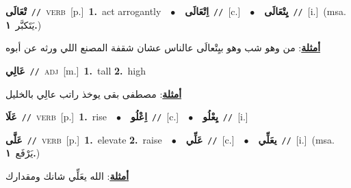 \documentclass[10pt,a4paper,twoside]{article} %
\begin{document}
\begin{multicols}{2}
{\setlength\topsep{0pt}\textbf{\foreignlanguage{arabic}{تْعَالَى}}\ {\color{gray}\texttt{//}\color{black}}\ \textsc{verb}\ [p.]\ \textbf{1.}~act arrogantly\ \ $\bullet$\ \ \setlength\topsep{0pt}\textbf{\foreignlanguage{arabic}{اِتْعَالَى}}\ {\color{gray}\texttt{//}\color{black}}\ [c.]\ \ $\bullet$\ \ \setlength\topsep{0pt}\textbf{\foreignlanguage{arabic}{يِتْعَالَى}}\ {\color{gray}\texttt{//}\color{black}}\ [i.]\ \color{gray}(msa. \foreignlanguage{arabic}{يَتَكبَّر}~\foreignlanguage{arabic}{\textbf{١.}})\color{black}\  \begin{flushright}\color{gray}\foreignlanguage{arabic}{\textbf{\underline{\foreignlanguage{arabic}{أمثلة}}}: من وهو شب وهو بيِتْعالَى عالناس عشان شقفة المصنع اللي ورثه عن أبوه}\end{flushright}\color{black}} \vspace{2mm}

{\setlength\topsep{0pt}\textbf{\foreignlanguage{arabic}{عَالِي}}\ {\color{gray}\texttt{//}\color{black}}\ \textsc{adj}\ [m.]\ \textbf{1.}~tall  \textbf{2.}~high\  \begin{flushright}\color{gray}\foreignlanguage{arabic}{\textbf{\underline{\foreignlanguage{arabic}{أمثلة}}}: مصطفى بقى يوخذ راتب عالِي بالخليل}\end{flushright}\color{black}} \vspace{2mm}

{\setlength\topsep{0pt}\textbf{\foreignlanguage{arabic}{عَلَا}}\ {\color{gray}\texttt{//}\color{black}}\ \textsc{verb}\ [p.]\ \textbf{1.}~rise\ \ $\bullet$\ \ \setlength\topsep{0pt}\textbf{\foreignlanguage{arabic}{اِعْلُو}}\ {\color{gray}\texttt{//}\color{black}}\ [c.]\ \ $\bullet$\ \ \setlength\topsep{0pt}\textbf{\foreignlanguage{arabic}{يِعْلُو}}\ {\color{gray}\texttt{//}\color{black}}\ [i.]\ } \vspace{2mm}

{\setlength\topsep{0pt}\textbf{\foreignlanguage{arabic}{عَلَّى}}\ {\color{gray}\texttt{//}\color{black}}\ \textsc{verb}\ [p.]\ \textbf{1.}~elevate  \textbf{2.}~raise\ \ $\bullet$\ \ \setlength\topsep{0pt}\textbf{\foreignlanguage{arabic}{عَلِّي}}\ {\color{gray}\texttt{//}\color{black}}\ [c.]\ \ $\bullet$\ \ \setlength\topsep{0pt}\textbf{\foreignlanguage{arabic}{يعَلِّي}}\ {\color{gray}\texttt{//}\color{black}}\ [i.]\ \color{gray}(msa. \foreignlanguage{arabic}{يَرْفَع}~\foreignlanguage{arabic}{\textbf{١.}})\color{black}\  \begin{flushright}\color{gray}\foreignlanguage{arabic}{\textbf{\underline{\foreignlanguage{arabic}{أمثلة}}}: الله يعَلِّي شانك ومقدارك}\end{flushright}\color{black}} \vspace{2mm}


\end{multicols}
\end{document}
